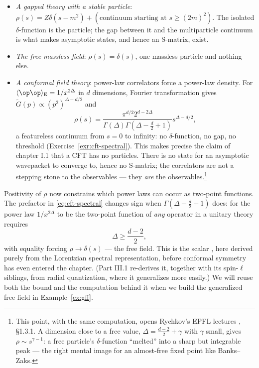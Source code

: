 \begin{itemize}
\item \emph{A gapped theory with a stable particle}: $\rho(s) = Z\delta(s -
m^2) + (\text{continuum starting at } s \ge (2m)^2)$. The isolated
$\delta$-function is the particle; the gap between it and the multiparticle
continuum is what makes asymptotic states, and hence an S-matrix, exist.
\item \emph{The free massless field}: $\rho(s) = \delta(s)$, one massless
particle and nothing else.
\item \emph{A conformal field theory}: power-law correlators force a power-law
density. For $\langle\op\op\rangle_{\rm E} = 1/x^{2\Delta}$ in $d$ dimensions,
Fourier transformation gives $\tilde G(p) \propto (p^2)^{\Delta - d/2}$ and
\begin{equation}
\rho(s) = \frac{\pi^{d/2} 2^{d - 2\Delta}}{\Gamma(\Delta)
\Gamma\left(\Delta - \tfrac{d}{2} + 1\right)} s^{\Delta - d/2},
\label{eq:cft-spectral}
\end{equation}
a featureless continuum from $s = 0$ to infinity: no $\delta$-function, no gap,
no threshold (Exercise~\ref{exr:cft-spectral}). This makes precise the claim of
chapter I.1 that a CFT has no particles. There is no state for an asymptotic
wavepacket to converge to, hence no S-matrix; the correlators are not a
stepping stone to the observables --- they \emph{are} the
observables.\footnote{This point, with the same computation, opens Rychkov's
EPFL lectures , \S1.3.1. A dimension close to a free value,
$\Delta = \frac{d-2}{2} + \gamma$ with $\gamma$ small, gives $\rho \sim
s^{\gamma - 1}$: a free particle's $\delta$-function ``melted'' into a sharp
but integrable peak --- the right mental image for an almost-free fixed point
like Banks--Zaks.}
\end{itemize}

Positivity of $\rho$ now constrains which power laws can occur as two-point
functions. The prefactor in
\eqref{eq:cft-spectral}
changes sign when $\Gamma(\Delta - \frac d2 + 1)$ does: for the power law
$1/x^{2\Delta}$ to be the two-point function of \emph{any} operator in a
unitary theory requires
\begin{equation}
\Delta \ge \frac{d-2}{2},
\label{eq:scalar-unitarity-bound}
\end{equation}
with equality forcing $\rho \to \delta(s)$ --- the free field. This is the
scalar , here derived purely from the Lorentzian
spectral representation, before conformal symmetry has even entered the
chapter. (Part III.1 re-derives it, together with its spin-$\ell$ siblings,
from radial quantization, where it generalizes more easily.) We will reuse both
the bound and the computation behind it when we build the generalized free
field in Example~\ref{ex:gff}.

